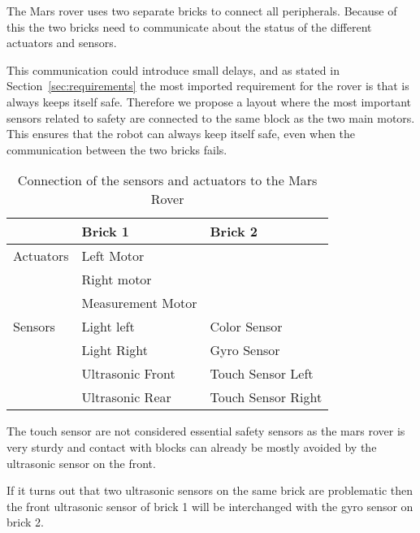 The Mars rover uses two separate bricks to connect all peripherals. Because of
this the two bricks need to communicate about the status of the different
actuators and sensors. 

This communication could introduce small delays, and as stated in
Section~\ref{sec:requirements} the most imported requirement for the rover is
that is always keeps itself safe. Therefore we propose a layout where the most
important sensors related to safety are connected to the same block as the
two main motors. This ensures that the robot can always keep itself safe,
even when the communication between the two bricks fails.

\begin{table}[H]
	\centering
	\begin{tabular}{|l|l|l|}
		\hline
					& \textbf{Brick 1} & \textbf{Brick 2} \\  \hline
		\hline
		Actuators 	& Left Motor & \\  
					& Right motor & \\  
					& Measurement Motor & \\  
		\hline
		Sensors 	& Light left & Color Sensor \\  
					& Light Right & Gyro Sensor \\  
					& Ultrasonic Front & Touch Sensor Left \\  
					& Ultrasonic Rear & Touch Sensor Right \\  
		\hline
	\end{tabular}
\caption{Connection of the sensors and actuators to the Mars Rover}
\label{tbl:layout}
\end{table}

The touch sensor are not considered essential safety sensors as the mars rover
is very sturdy and contact with blocks can already be mostly avoided by the
ultrasonic sensor on the front. 

If it turns out that two ultrasonic sensors on the same brick are problematic
then the front ultrasonic sensor of brick 1 will be interchanged with the
gyro sensor on brick 2. 